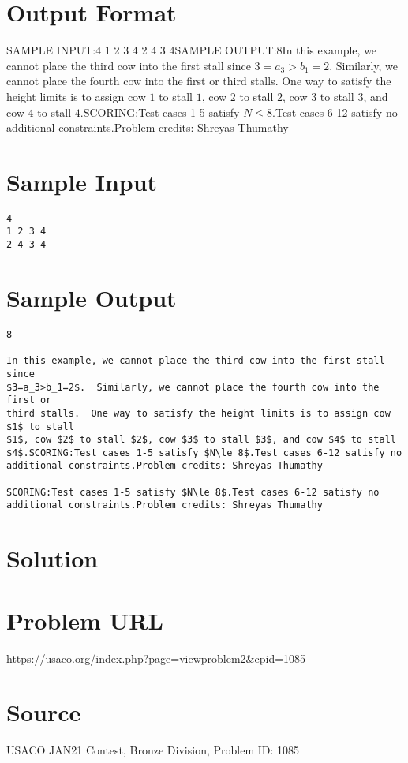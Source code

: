 \documentclass[12pt]{article}
\begin{document}
\section*{Output Format}
SAMPLE INPUT:4
1 2 3 4
2 4 3 4SAMPLE OUTPUT:8In this example, we cannot place the third cow into the first stall  since
$3=a_3>b_1=2$.  Similarly, we cannot place the fourth cow into the  first or
third stalls.  One way to satisfy the height limits is to assign cow $1$ to stall
$1$, cow $2$ to stall $2$, cow $3$ to stall $3$, and cow $4$ to stall $4$.SCORING:Test cases 1-5 satisfy $N\le 8$.Test cases 6-12 satisfy no additional constraints.Problem credits: Shreyas Thumathy

\section*{Sample Input}
\begin{verbatim}
4
1 2 3 4
2 4 3 4
\end{verbatim}

\section*{Sample Output}
\begin{verbatim}
8

In this example, we cannot place the third cow into the first stall  since
$3=a_3>b_1=2$.  Similarly, we cannot place the fourth cow into the  first or
third stalls.  One way to satisfy the height limits is to assign cow $1$ to stall
$1$, cow $2$ to stall $2$, cow $3$ to stall $3$, and cow $4$ to stall $4$.SCORING:Test cases 1-5 satisfy $N\le 8$.Test cases 6-12 satisfy no additional constraints.Problem credits: Shreyas Thumathy

SCORING:Test cases 1-5 satisfy $N\le 8$.Test cases 6-12 satisfy no additional constraints.Problem credits: Shreyas Thumathy
\end{verbatim}

\section*{Solution}


\section*{Problem URL}
https://usaco.org/index.php?page=viewproblem2&cpid=1085

\section*{Source}
USACO JAN21 Contest, Bronze Division, Problem ID: 1085
\end{document}
